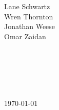 \begin{titlepage}
\begin{center}
\begin{minipage}{0.4\textwidth}
\begin{flushright}
Lane Schwartz\\
Wren Thornton\\
Jonathan Weese\\
Omar Zaidan
\end{flushright}
\end{minipage}
%
\ \\ %
\ \\ %
\ \\ %
\ \\ %
\ \\ %
%
%
\vfill %
%
{\large \today}
%
\end{center}
\end{titlepage}
